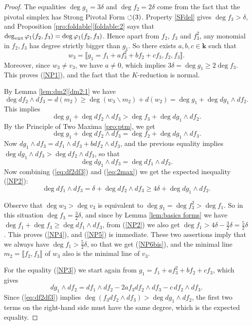 \documentclass[reqno,oneside,11pt]{amsart}
\theoremstyle{plain}
\theoremstyle{definition}
\newcommand{\K}{\mathbf{k}}
\newcommand{\PF}{\text{$\circlearrowleft$\!\,}}
\renewcommand{\phi}{\varphi}
\newcommand{\dvirt}{\deg_{\text{\rm virt}}}
\newcommand{\llb}{\llbracket}
\newcommand{\rrb}{\rrbracket}
\renewcommand{\ge}{\geqslant}
\begin{document}
\begin{proof}
The equalities $\deg g_1 = 3\delta$ and $\deg f_2 = 2\delta$ come from the fact that the pivotal simplex has Strong Pivotal Form $\PF(3)$.
Property \ref{SFdel} gives $\deg f_3 > \delta$, and Proposition \ref{pro:foldable}\ref{foldable:2} says that $\dvirt \phi_1(f_2,f_3) = \deg \phi_1(f_2,f_3)$.
Hence apart from $f_2$, $f_3$ and $f_3^2$, any monomial in $f_2, f_3$ has degree strictly bigger than $g_1$.
So there exists $a,b,c \in \K$ such that
$$w_3 = \llb g_1 = f_1 + af_ 3^2 + bf_2 + cf_3, f_2, f_3 \rrb.$$
Moreover, since $w_3 \neq v_3$, we have $a \neq 0$, which implies $3\delta = \deg g_1 \ge 2\deg f_3$.
This proves (\ref{NP1}), and the fact that the $K$-reduction is normal.

By Lemma \ref{lem:dm2}\ref{dm2:1} we have
\begin{equation}\label{eq:df2df3}
\deg df_2 \wedge df_3 = d(m_2) \ge \deg(w_3\smallsetminus m_2) + d(w_2) = \deg g_1 + \deg dg_1 \wedge df_2.
\end{equation}
This implies
$$\deg g_1 + \deg df_2 \wedge df_3 > \deg f_3 + \deg dg_1 \wedge df_2.$$
By the Principle of Two Maxima \ref{pro:ptm}, we get
\begin{equation}\label{eq:2max}
\deg g_1 + \deg df_2 \wedge df_3 = \deg f_2 + \deg dg_1 \wedge df_3.
\end{equation}
Now $dg_1 \wedge df_3 = df_1 \wedge df_3 + bdf_2 \wedge df_3$, and the previous equality implies $\deg dg_1 \wedge df_3 > \deg df_2 \wedge df_3$, so that
$$\deg dg_1 \wedge df_3 = \deg df_1 \wedge df_3.$$
Now combining (\ref{eq:df2df3}) and (\ref{eq:2max}) we get the expected inequality (\ref{NP2}):
\begin{equation*}
\deg df_1 \wedge df_3 = \delta + \deg df_2 \wedge df_3 \ge 4\delta + \deg dg_1 \wedge df_2.
\end{equation*}

Observe that $\deg w_3 > \deg v_3$ is equivalent to $\deg g_1 = \deg f_3^2 > \deg f_1$.
So in this situation $\deg f_3 = \frac32 \delta$, and since by Lemma \ref{lem:basics forms} we have $\deg f_1 + \deg f_3 \ge \deg df_1 \wedge df_3$, from (\ref{NP2}) we also get $\deg f_1 > 4\delta - \frac32 \delta = \frac52 \delta$.
This proves (\ref{NP4}), and (\ref{NP5}) is immediate.
These two assertions imply that we always have $\deg f_1 > \frac52 \delta$, so
that we get (\ref{NP6bis}), and
the minimal line $m_2 =\llb f_2, f_3 \rrb$ of $w_3$ also is the minimal line of
$v_3$.

For the equality (\ref{NP3}) we start again from $g_1 = f_1 + af_3^2 + bf_2 + cf_3$, which gives
$$dg_1 \wedge df_2 = df_1 \wedge df_2 -2 a f_3 df_2 \wedge df_3 - c\, df_2 \wedge df_3 .$$
Since (\ref{eq:df2df3}) implies $\deg (f_3 df_2 \wedge df_3) > \deg dg_1 \wedge df_2$, the first two terms on the right-hand side must have the same degree, which is the expected equality.


\end{proof}
\end{document}
